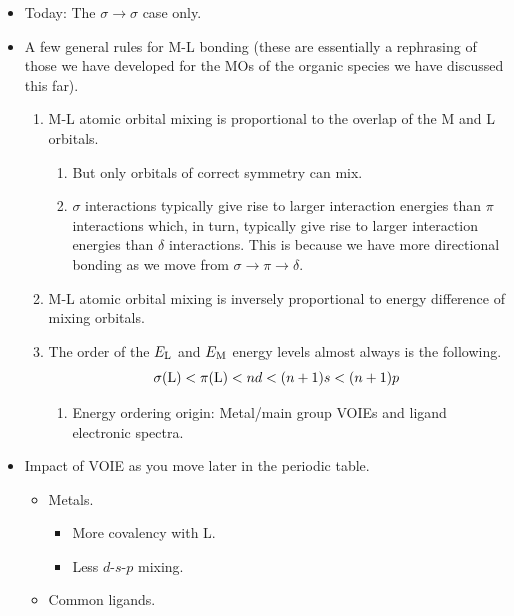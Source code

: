 \documentclass[../notes.tex]{subfiles}
\begin{document}
\begin{itemize}
\begin{itemize}
    \end{itemize}
    \item Today: The $\sigma\to\sigma$ case only.
    \item A few general rules for M-L bonding (these are essentially a rephrasing of those we have developed for the MOs of the organic species we have discussed this far).
    \begin{enumerate}
        \item M-L atomic orbital mixing is proportional to the overlap of the M and L orbitals.
        \begin{enumerate}
            \item But only orbitals of correct symmetry can mix.
            \item $\sigma$ interactions typically give rise to larger interaction energies than $\pi$ interactions which, in turn, typically give rise to larger interaction energies than $\delta$ interactions. This is because we have more directional bonding as we move from $\sigma\to\pi\to\delta$.
        \end{enumerate}
        \item M-L atomic orbital mixing is inversely proportional to energy difference of mixing orbitals.
        \item The order of the $E_{\ce{L}}$ and $E_{\ce{M}}$ energy levels almost always is the following.
        \begin{equation*}
            \sigma(\ce{L}) < \pi(\ce{L})
            < nd
            < (n+1)s
            < (n+1)p
        \end{equation*}
        \begin{enumerate}
            \item Energy ordering origin: Metal/main group VOIEs and ligand electronic spectra.
        \end{enumerate}
    \end{enumerate}
    \item Impact of VOIE as you move later in the periodic table.
    \begin{itemize}
        \item Metals.
        \begin{itemize}
            \item More covalency with L.
            \item Less $d$-$s$-$p$ mixing.
        \end{itemize}
        \item Common ligands.
        \begin{itemize}

\end{itemize}
\end{itemize}
\end{itemize}
\end{document}
